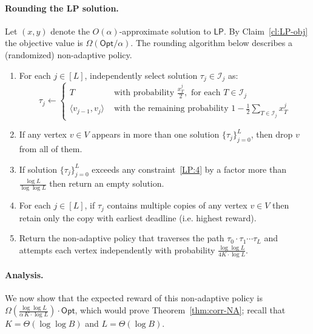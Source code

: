 \documentclass[11pt,letterpaper]{article}
\numberwithin{algorithm}{section}
\newcommand{\I}{{\mathcal{I}}}
\newcommand{\Opt}{\ensuremath{\mathsf{Opt}}\xspace}
\newcommand{\lp}{\ensuremath{\mathsf{LP}}\xspace}
\begin{document}
\paragraph{Rounding the LP solution.} Let $(x,y)$ denote the $O(\alpha)$-approximate solution to \lp. By Claim~\ref{cl:LP-obj} the objective value is $\Omega(\Opt/\alpha)$. The rounding algorithm below describes a (randomized) non-adaptive policy.
\begin{enumerate}
\item \label{step:corr1} For each $j\in[L]$, independently select solution $\tau_j\in \I_j$ as:
$$\tau_j \gets \left\{
\begin{array}{ll}
T&\mbox{ with probability } \frac{x^j_T}{2}, \mbox{ for each } T\in \I_j \\
\langle v_{j-1},v_j\rangle & \mbox{ with the remaining probability } 1-\frac12 \sum_{T\in \I_j} x^j_T
\end{array}\right.
$$


\item \label{step:corr2} If any vertex $v\in V$ appears in more than one solution $\{\tau_j\}_{j=0}^L$, then drop $v$ from all of them.

\item \label{step:corr3} If solution $\{\tau_j\}_{j=0}^L$ exceeds any constraint~\eqref{LP:4} by a factor more than $\frac{\log L}{\log\log L}$ then return an empty solution.

\item \label{step:corr4} For each $j\in[L]$, if $\tau_j$ contains multiple copies of any vertex $v\in V$ then retain only the copy with earliest deadline (i.e. highest reward).

\item \label{step:corr5} Return the non-adaptive policy that traverses the path $\tau_0\cdot \tau_1\cdots\tau_L$  and attempts each vertex independently with probability $\frac{\log\log L}{4K\cdot \log L}$.
\end{enumerate}

\paragraph{Analysis.} We now show that the expected reward of this non-adaptive policy is $\Omega(\frac{\log\log L}{\alpha\, K\cdot \log L})\cdot \Opt$, which would prove Theorem~\ref{thm:corr-NA}; recall that $K=\Theta(\log\log B)$ and $L=\Theta(\log B)$.
\end{document}
